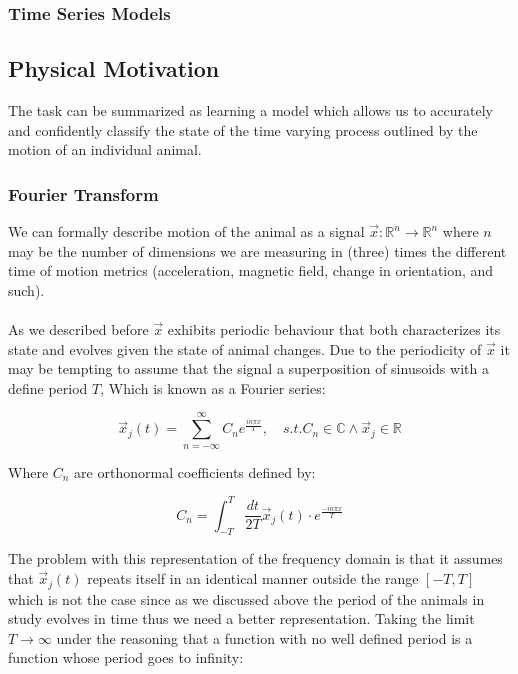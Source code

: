 \documentclass[10pt]{article}
\begin{document}
\subsubsection{Time Series Models}

\subsection{Physical Motivation}

The task can be summarized as learning a model which allows us to accurately and confidently  classify the state of the time varying process outlined by the motion of an individual animal. 


\subsubsection{Fourier Transform}


We can formally describe motion of the animal as a signal $\vec{x} : \mathbb{R}^{n} \rightarrow \mathbb{R}^{n}$ where $n$ may be the number of dimensions we are measuring in (three) times the different time of motion metrics (acceleration, magnetic field, change in orientation, and such). 
\\ \\
As we described before $\vec{x}$ exhibits periodic behaviour that both characterizes its state and evolves given the state of animal changes. Due to the periodicity of $\vec{x}$ it may be tempting to assume that the signal a superposition of sinusoids with a define period $T$, Which is known as a Fourier series:

\begin{equation*}
\vec{x}_{j}(t) = \sum_{n=-\infty}^{\infty} C_{n}e^{\frac{in\pi x}{T}} , \quad s.t.  C_{n} \in \mathbb{C}\wedge \vec{x}_{j} \in \mathbb{R} 
\end{equation*}

Where $C_{n}$ are orthonormal coefficients defined by:

\begin{equation*}
C_{n} = \int_{-T}^{T}\frac{dt}{2T}\vec{x}_{j}(t) \cdot e^{\frac{-in\pi x}{T}}
\end{equation*}

The problem with this representation of the frequency domain is that it assumes that $\vec{x}_{j}(t) $ repeats itself in an identical manner outside the range $[-T, T]$ which is not the case since as we discussed above the period of the animals in study evolves in time thus we need a better representation. Taking the limit $T \rightarrow{\infty}$ under the reasoning that a function with no well defined period is a function whose period goes to infinity:
\end{document}
